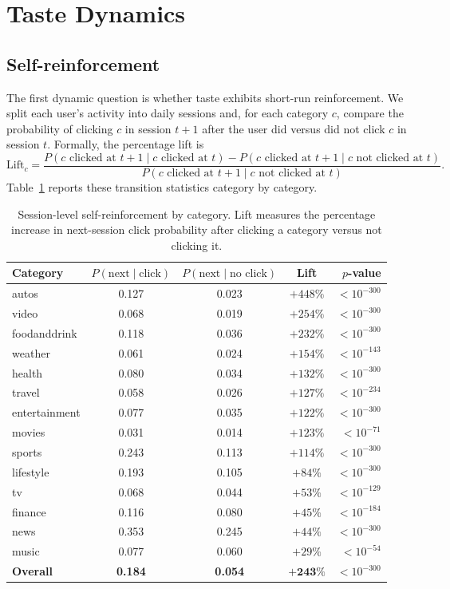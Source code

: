 \documentclass[11pt]{article}
\begin{document}
\section{Taste Dynamics}
\label{sec:taste}

\subsection{Self-reinforcement}

The first dynamic question is whether taste exhibits short-run reinforcement. We split each user's activity into daily sessions and, for each category $c$, compare the probability of clicking $c$ in session $t+1$ after the user did versus did not click $c$ in session $t$. Formally, the percentage lift is
\[
\text{Lift}_c = \frac{P(c\text{ clicked at }t{+}1\mid c\text{ clicked at }t)-P(c\text{ clicked at }t{+}1\mid c\text{ not clicked at }t)}{P(c\text{ clicked at }t{+}1\mid c\text{ not clicked at }t)}.
\]
Table~\ref{tab:selfreinforcement} reports these transition statistics category by category.

\begin{table}[ht]
\centering
\caption{Session-level self-reinforcement by category. Lift measures the percentage increase in next-session click probability after clicking a category versus not clicking it.}
\label{tab:selfreinforcement}
\small
\begin{tabular}{lcccr}
\toprule
Category & $P(\text{next} \mid \text{click})$ & $P(\text{next} \mid \text{no click})$ & Lift & $p$-value \\
\midrule
autos & 0.127 & 0.023 & $+448\%$ & $< 10^{-300}$ \\
video & 0.068 & 0.019 & $+254\%$ & $< 10^{-300}$ \\
foodanddrink & 0.118 & 0.036 & $+232\%$ & $< 10^{-300}$ \\
weather & 0.061 & 0.024 & $+154\%$ & $< 10^{-143}$ \\
health & 0.080 & 0.034 & $+132\%$ & $< 10^{-300}$ \\
travel & 0.058 & 0.026 & $+127\%$ & $< 10^{-234}$ \\
entertainment & 0.077 & 0.035 & $+122\%$ & $< 10^{-300}$ \\
movies & 0.031 & 0.014 & $+123\%$ & $< 10^{-71}$ \\
sports & 0.243 & 0.113 & $+114\%$ & $< 10^{-300}$ \\
lifestyle & 0.193 & 0.105 & $+84\%$ & $< 10^{-300}$ \\
tv & 0.068 & 0.044 & $+53\%$ & $< 10^{-129}$ \\
finance & 0.116 & 0.080 & $+45\%$ & $< 10^{-184}$ \\
news & 0.353 & 0.245 & $+44\%$ & $< 10^{-300}$ \\
music & 0.077 & 0.060 & $+29\%$ & $< 10^{-54}$ \\
\midrule
\textbf{Overall} & \textbf{0.184} & \textbf{0.054} & $\boldsymbol{+243\%}$ & $< 10^{-300}$ \\
\bottomrule
\end{tabular}
\end{table}
\FloatBarrier
\end{document}
